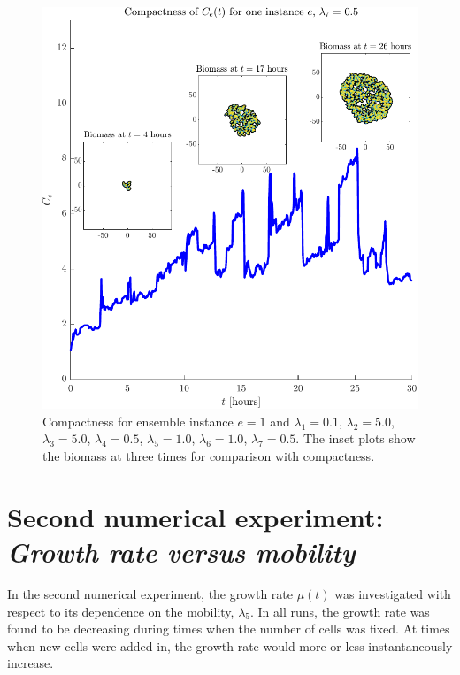\begin{figure}[!htb] %
    \centering
    \includegraphics[width= \textwidth]{
        chapter4/figures/Inset_L1_0o10_L2_5o00_L3_5o00_L4_0o50_L5_1o00_L6_1o00_L7_0o50.pdf}
    \caption{Compactness for ensemble instance $e = 1$ and 
             $\lambda_1 = 0.1$,  
             $\lambda_2 = 5.0$, 
             $\lambda_3 = 5.0$, 
             $\lambda_4 = 0.5$, 
             $\lambda_5 = 1.0$, 
             $\lambda_6 = 1.0$, 
             $\lambda_7 = 0.5$. The inset plots show the biomass at three times for comparison 
             with compactness.}
    \label{fig:compactnessSingleInstance0.5}
\end{figure}


\section{Second numerical experiment: \\ \textit{Growth rate versus mobility}}\label{sec:numExp2}

In the second numerical experiment, the growth rate $\mu(t)$ was investigated with respect 
to its dependence on the mobility, $\lambda_5$. In all runs, the growth rate was found to be decreasing 
during times when the number of cells was fixed. At times when new cells were added in,
the growth rate would more or less instantaneously increase. 
\\

